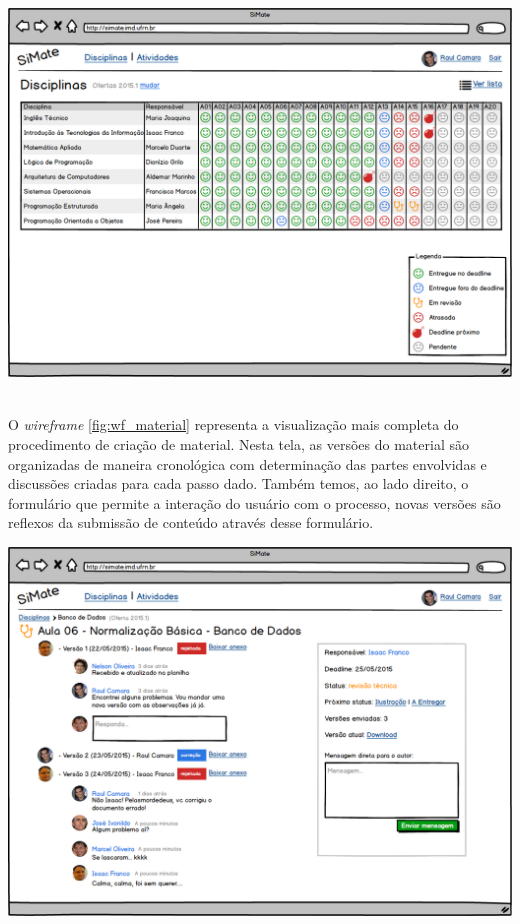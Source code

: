 \vspace{5mm}
\begin{minipage}[c]{\textwidth}
    \includegraphics[width=15cm]{Wireframes/GradeDisciplinas.png}
	\label{fig:wf_offers_list}
\end{minipage} \\

O \textit{wireframe} \hyperref[fig:wf_material]{\ref{fig:wf_material}} representa a visualização mais completa do procedimento de criação de material. Nesta tela, as versões do material são organizadas de maneira cronológica com determinação das partes envolvidas e discussões criadas para cada passo dado. Também temos, ao lado direito, o formulário que permite a interação do usuário com o processo, novas versões são reflexos da submissão de conteúdo através desse formulário.

\vspace{5mm}
\begin{minipage}[c]{\textwidth}
    \includegraphics[width=15cm]{Wireframes/ArtefatoDetalhe.png}
	\label{fig:wf_material}
\end{minipage} \\

